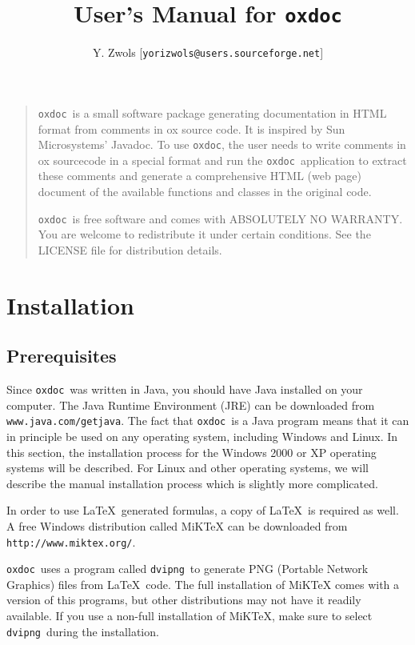 \documentclass[11pt]{article}
\newcommand\oxdoc{{\tt oxdoc}}
\newcommand\dvipng{{\tt dvipng}}
\begin{document}
\title{\bf User's Manual for {\tt \textbf{oxdoc}}}
\author{Y. Zwols [{\tt yorizwols@users.sourceforge.net}]}
\maketitle\bigskip

\begin{quote}
\small\oxdoc~is a small software package generating documentation in 
HTML format from comments in ox source code. It is inspired by
Sun Microsystems' Javadoc. 
To use \oxdoc, the user needs to write comments in ox sourcecode
in a special format 
and run the \oxdoc~application to extract these comments and
generate a comprehensive HTML (web page) document of the available 
functions and classes in the original code. \bigskip

\oxdoc~is free software and comes with ABSOLUTELY NO WARRANTY.
You are welcome to redistribute it under certain conditions.
See the LICENSE file for distribution details.
\end{quote}



\newpage\section{Installation}

\subsection{Prerequisites}
Since \oxdoc~was written in Java, you should have Java installed on your computer.  
The Java Runtime Environment (JRE) can be downloaded from {\tt www.java.com/getjava}.
The fact that \oxdoc~is a Java program means that it can in principle be used on 
any operating system, including Windows and Linux. In this section, the installation
process for the Windows 2000 or XP operating systems will be described. 
For Linux and other operating systems, we will describe the manual installation 
process which is slightly more complicated.

In order to use \LaTeX~generated formulas, a copy of \LaTeX~is required as well.
A free Windows distribution called MiKTeX can be downloaded from {\tt http://www.miktex.org/}.

\oxdoc~uses a program called \dvipng~to generate PNG (Portable Network
Graphics) files from \LaTeX~code.  The full installation of MiKTeX comes with a version
of this programs, but other distributions may not have it readily available.  If you
use a non-full installation of MiKTeX, make sure to select \dvipng~during the
installation.
\end{document}
